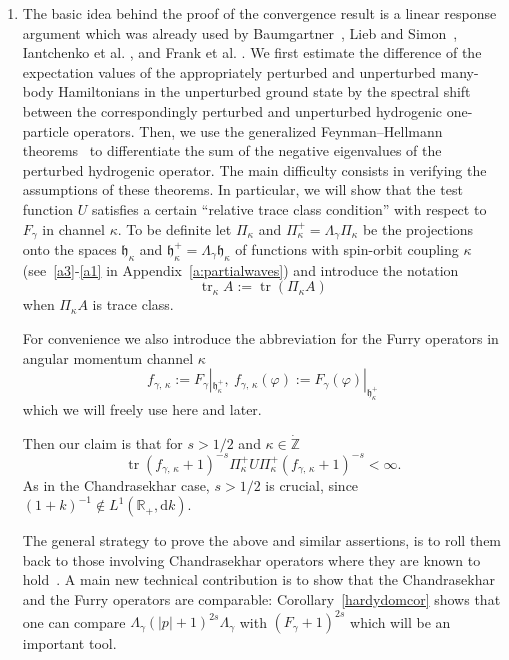 \documentclass[10pt]{amsart}
\theoremstyle{definition}
\DeclareMathOperator{\tr}{tr}
\newcommand*\rd{\mathrm{d}}
\newcommand*\gz{\mathbb{Z}}
\newcommand*\rz{\mathbb{R}}
\newcommand*\zp{\dot{\gz}}
\newcommand*\gh{\mathfrak{h}}
\newcommand*\ghk{{\gh_{\kappa}}}
\newcommand*\ghpk{{\gh^+_\kappa}}
\begin{document}
\begin{enumerate}
\item The basic idea behind the proof of the convergence result is a linear response argument which was already used by Baumgartner~\cite{Baumgartner1976}, Lieb and Simon~\cite{LiebSimon1977}, Iantchenko et al. \cite{Iantchenkoetal1996}, and Frank et al. \cite{Franketal2020R,Franketal2020P}. We first estimate the difference of the expectation values of the appropriately perturbed and unperturbed many-body Hamiltonians in the unperturbed ground state by the spectral shift between the correspondingly perturbed and unperturbed hydrogenic one-particle operators. Then, we use the generalized Feynman--Hellmann theorems~\cite[Theorem~3.2, Proposition~3.3]{Franketal2020P} to differentiate the sum of the negative eigenvalues of the perturbed hydrogenic operator. The main difficulty consists in verifying the assumptions of these theorems. In particular, we will show that the test function $U$ satisfies a certain ``relative trace class condition'' with respect to $F_\gamma$ in channel $\kappa$. To be definite let $\Pi_\kappa$ and $\Pi_\kappa^+=\Lambda_\gamma\Pi_\kappa$ be the projections onto the spaces $\ghk$ and $\ghpk=\Lambda_\gamma\ghk$ of functions with spin-orbit coupling $\kappa$ (see~\eqref{a3}-\eqref{a1} in Appendix~\ref{a:partialwaves}) and introduce the notation
\begin{equation}\label{ps}
\tr_\kappa A:= \tr\left(\Pi_\kappa A\right)
\end{equation}
when $\Pi_\kappa A$ is trace class.


For convenience we also introduce the abbreviation for the Furry operators in angular momentum channel $\kappa$
\begin{equation}\label{radialeops}
f_{\gamma,\,\kappa}:=F_\gamma|_\ghpk,\ f_{\gamma,\,\kappa}(\varphi):= F_\gamma(\varphi)|_\ghpk
\end{equation}
which we will freely use here and later.

Then our claim is that for $s>1/2$ and $\kappa\in\zp$
\[
\tr \left(f_{\gamma,\,\kappa}+1\right)^{-s}\Pi_\kappa^+U\Pi^+_\kappa\left(f_{\gamma,\,\kappa}+1\right)^{-s}<\infty.
\]
As in the Chandrasekhar case, $s>1/2$ is crucial, since $(1+k)^{-1}\notin L^1(\rz_+,\rd k)$.

The general strategy to prove the above and similar assertions, is to roll them back to those involving Chandrasekhar operators where they are known to hold~\cite[Corollary~4.5]{Franketal2020P}. A main new technical contribution is to show that the Chandrasekhar and the Furry operators are comparable: Corollary~\ref{hardydomcor} shows that one can compare $\Lambda_\gamma(|p|+1)^{2s}\Lambda_\gamma$ with $(F_\gamma+1)^{2s}$ which will be an important tool.
\end{enumerate}
\end{document}
